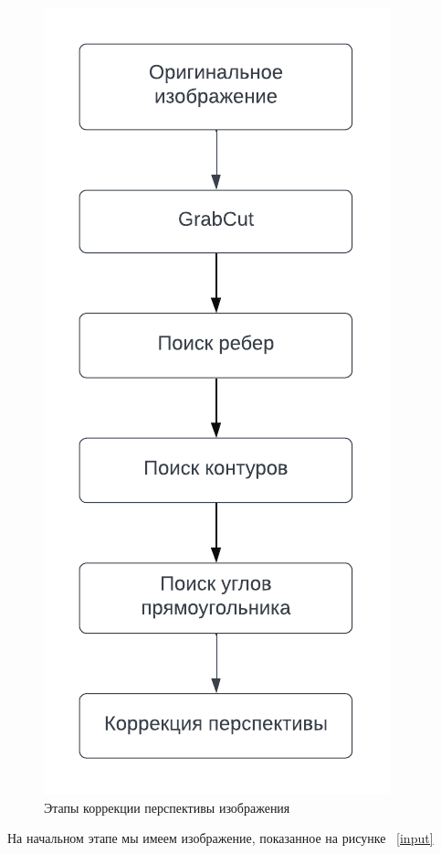 \begin{figure}
    \includegraphics[scale=0.75]{img/perspective_correction}
    \caption{Этапы коррекции перспективы изображения}
    \label{perspective_correction}
\end{figure}

На начальном этапе мы имеем изображение, показанное на рисунке ~\ref{input}

